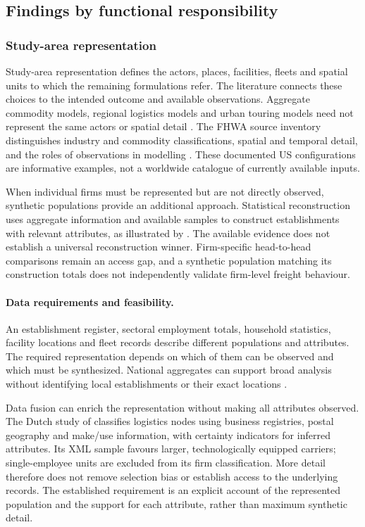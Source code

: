 \subsection{Findings by functional responsibility}\label{sec:slr-synthesis}

\subsubsection{Study-area representation}\label{sec:f1}
Study-area representation defines the actors, places, facilities, fleets and
spatial units to which the remaining formulations refer. The literature connects
these choices to the intended outcome and available observations. Aggregate
commodity models, regional logistics models and urban touring models need
not represent the same actors or spatial detail \parencite{chow2010}. The FHWA
source inventory distinguishes industry and commodity classifications, spatial
and temporal detail, and the roles of observations in modelling
\parencite{fhwa2018}. These documented US configurations are informative
examples, not a worldwide catalogue of currently available inputs.

When individual firms must be represented but are not directly observed,
synthetic populations provide an additional approach. Statistical reconstruction
uses aggregate information and available samples to construct establishments
with relevant attributes, as illustrated by \textcite{wisetjindawat2009}.
The available evidence does not establish a universal reconstruction winner.
Firm-specific head-to-head comparisons remain an access gap, and a synthetic
population matching its construction totals does not independently validate
firm-level freight behaviour.

\paragraph{Data requirements and feasibility.}
An establishment register, sectoral employment totals, household statistics,
facility locations and fleet records describe different populations and
attributes. The required representation depends on which of them can be
observed and which must be synthesized. National aggregates can support broad
analysis without identifying local establishments or their exact locations
\parencite{fhwa2017}.

Data fusion can enrich the representation without making all attributes
observed. The Dutch study of \textcite{mohammed2023} classifies logistics nodes
using business registries, postal geography and make/use information, with
certainty indicators for inferred attributes. Its XML sample favours larger,
technologically equipped carriers; single-employee units are excluded from
its firm classification. More detail therefore does not remove selection bias
or establish access to the underlying records. The established requirement is
an explicit account of the represented population and the support for each
attribute, rather than maximum synthetic detail.

